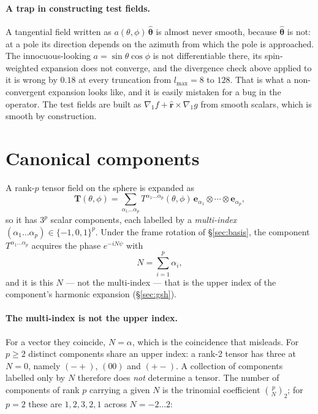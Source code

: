 \documentclass[11pt,a4paper]{article}
\newcommand{\ebasis}[1]{\mathbf{e}_{#1}}
\begin{document}
\paragraph{A trap in constructing test fields.}  A tangential field
written as $a(\theta,\phi)\,\hat{\boldsymbol{\theta}}$ is almost never
smooth, because $\hat{\boldsymbol{\theta}}$ is not: at a pole its direction
depends on the azimuth from which the pole is approached.  The
innocuous-looking $a=\sin\theta\cos\phi$ is not differentiable there, its
spin-weighted expansion does not converge, and the divergence check above
applied to it is wrong by $0.18$ at every truncation from $l_{\max}=8$ to
$128$.  That is what a non-convergent expansion looks like, and it is
easily mistaken for a bug in the operator.  The test fields are built as
$\nabla_1 f + \hat{\mathbf{r}}\times\nabla_1 g$ from smooth scalars, which
is smooth by construction.

\section{Canonical components}
\label{sec:components}

A rank-$p$ tensor field on the sphere is expanded as
\begin{equation}
  \mathbf{T}(\theta,\phi) = \sum_{\alpha_1 \ldots \alpha_p}
    T^{\alpha_1 \ldots \alpha_p}(\theta,\phi)\,
    \ebasis{\alpha_1} \otimes \cdots \otimes \ebasis{\alpha_p},
  \label{eq:tensor}
\end{equation}
so it has $3^p$ scalar components, each labelled by a \emph{multi-index}
$(\alpha_1\ldots\alpha_p)\in\{-1,0,1\}^p$.  Under the frame rotation of
\S\ref{sec:basis}, the component $T^{\alpha_1\ldots\alpha_p}$ acquires the
phase $e^{-iN\psi}$ with
\begin{equation}
  N = \sum_{i=1}^{p} \alpha_i,
  \label{eq:N}
\end{equation}
and it is this $N$ --- not the multi-index --- that is the upper index of
the component's harmonic expansion (\S\ref{sec:gsh}).

\paragraph{The multi-index is not the upper index.}  For a vector they
coincide, $N=\alpha$, which is the coincidence that misleads.  For
$p\geq 2$ distinct components share an upper index: a rank-2 tensor has
three at $N=0$, namely $(-+)$, $(00)$ and $(+-)$.  A collection of
components labelled only by $N$ therefore does \emph{not} determine a
tensor.  The number of components of rank $p$ carrying a given $N$ is the
trinomial coefficient $\binom{p}{N}_{\!2}$; for $p=2$ these are
$1,2,3,2,1$ across $N=-2\ldots 2$:
\end{document}
